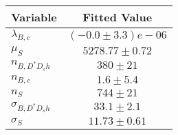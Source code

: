 \begin{tabular}[t]{lc}
\hline
Variable &Fitted Value\\
\hline\hline
$\lambda_{B,c}$&$(-0.0\pm3.3)e-06$\\
\hline
$\mu_S$&$5278.77\pm0.72$\\
\hline
$n_{B, D^* D_s h}$&$380\pm21$\\
\hline
$n_{B,c}$&$1.6\pm5.4$\\
\hline
$n_S$&$744\pm21$\\
\hline
$\sigma_{B, D^* D_s h}$&$33.1\pm2.1$\\
\hline
$\sigma_S$&$11.73\pm0.61$\\
\hline
\end{tabular}
